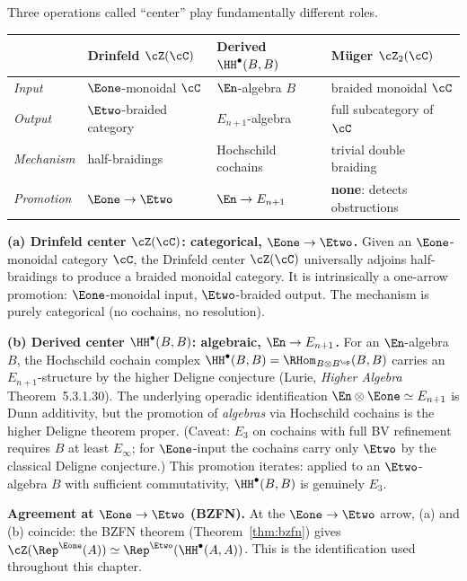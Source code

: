 \begin{remark}
\label{rem:three-centers-sharp}
\label{rem:three-centers}
Three operations called ``center'' play fundamentally different roles.

\begin{center}
\begin{tabular}{llll}
\toprule
 & Drinfeld $\cZ(\cC)$ & Derived $\HH^\bullet(B,B)$
 & M\"uger $\cZ_2(\cC)$ \\
\midrule
\emph{Input} & $\Eone$-monoidal $\cC$ & $\En$-algebra $B$
 & braided monoidal $\cC$ \\
\emph{Output} & $\Etwo$-braided category & $E_{n+1}$-algebra
 & full subcategory of $\cC$ \\
\emph{Mechanism} & half-braidings & Hochschild cochains
 & trivial double braiding \\
\emph{Promotion} & $\Eone \to \Etwo$ & $\En \to E_{n+1}$
 & \textbf{none}: detects obstructions \\
\bottomrule
\end{tabular}
\end{center}

\noindent\textbf{(a) Drinfeld center $\cZ(\cC)$: categorical,
$\Eone \to \Etwo$.}
Given an $\Eone$-monoidal category $\cC$, the Drinfeld center
$\cZ(\cC)$ universally adjoins half-braidings to produce a braided
monoidal category. It is intrinsically a one-arrow promotion:
$\Eone$-monoidal input, $\Etwo$-braided output. The mechanism is
purely categorical (no cochains, no resolution).

\noindent\textbf{(b) Derived center $\HH^\bullet(B,B)$: algebraic,
$\En \to E_{n+1}$.}
For an $\En$-algebra $B$, the Hochschild cochain complex
$\HH^\bullet(B,B) = \RHom_{B \otimes B^{\op}}(B,B)$ carries an
$E_{n+1}$-structure by the higher Deligne conjecture (Lurie,
\emph{Higher Algebra} Theorem~5.3.1.30). The underlying operadic
identification $\En \otimes \Eone \simeq E_{n+1}$ is Dunn additivity,
but the promotion of \emph{algebras} via Hochschild cochains is the
higher Deligne theorem proper. \textup{(Caveat: $E_3$ on cochains
with full BV refinement requires $B$ at least $E_\infty$; for
$\Eone$-input the cochains carry only $\Etwo$ by the classical
Deligne conjecture.)} This promotion iterates: applied to an
$\Etwo$-algebra $B$ with sufficient commutativity, $\HH^\bullet(B,B)$
is genuinely $E_3$.

\noindent\textbf{Agreement at $\Eone \to \Etwo$ (BZFN).}
At the $\Eone \to \Etwo$ arrow, (a) and (b) coincide: the BZFN theorem
(Theorem~\ref{thm:bzfn}) gives
$\cZ(\Rep^{\Eone}(A)) \simeq \Rep^{\Etwo}(\HH^\bullet(A,A))$.
This is the identification used throughout this chapter.


\end{remark}
